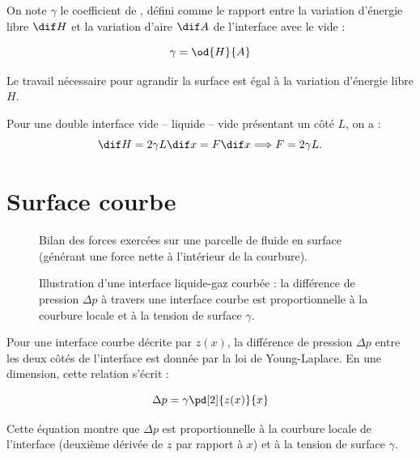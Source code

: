 On note $\gamma$ le coefficient de , défini comme le rapport entre la variation d’énergie libre $\dif H$ et la variation d’aire $\dif A$ de l’interface avec le vide :

\begin{displaymath}
  \gamma = \od{H}{A}
\end{displaymath}

Le travail nécessaire pour agrandir la surface est égal à la variation d’énergie libre $H$.

Pour une double interface vide -- liquide -- vide présentant un côté $L$, on a :
\begin{displaymath}
  \dif H = 2 \gamma L \dif x = F \dif x \Longrightarrow  F = 2 \gamma L.
\end{displaymath}

\section{Surface courbe}

\begin{figure}
  \begin{center}
    
  \end{center}
  \caption{Bilan des forces exercées sur une parcelle de fluide en surface (générant une force nette à l'intérieur de la courbure).}\label{fig:07_tension_1}
\end{figure}

\begin{figure}
  \begin{center}
    
  \end{center}
  \caption{Illustration d'une interface liquide-gaz courbée : la différence de pression $\Delta p$ à travers une interface courbe est proportionnelle à la courbure locale et à la tension de surface $\gamma$.}\label{fig:08_Young_Laplace}
\end{figure}

Pour une interface courbe décrite par $z(x)$, la différence de pression $\Delta p$ entre les deux côtés de l’interface est donnée par la loi de Young-Laplace. En une dimension, cette relation s’écrit :

\begin{displaymath}
  \Delta p = \gamma \pd[2]{z(x)}{x}
\end{displaymath}

Cette équation montre que $\Delta p$ est proportionnelle à la courbure locale de l’interface (deuxième dérivée de $z$ par rapport à $x$) et à la tension de surface $\gamma$.


